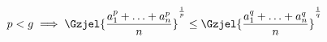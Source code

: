 $$
p<g \implies
\Gzjel{\frac{a_{1}^{p}+\hdots+a_{n}^{p}}{n}}^{\frac{1}{p}} \le  
\Gzjel{\frac{a_{1}^{q}+\hdots+a_{n}^{q}}{n}}^{\frac{1}{q}} 
$$


